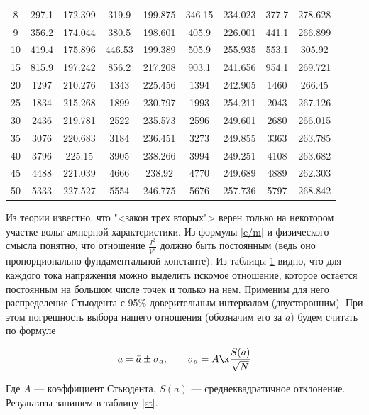 \documentclass[12pt]{kiarticle}
\begin{document}
\begin{table}
\begin{tabular}{|c|c|c|c|c|c|c|c|c|}
 8 & 297.1 & 172.399 & 319.9 & 199.875 & 346.15 & 234.023 & 377.7 & 278.628 \\
 9 & 356.2 & 174.044 & 380.5 & 198.601 & 405.9 & 226.001 & 441.1 & 266.899 \\
 10 & 419.4 & 175.896 & 446.53 & 199.389 & 505.9 & 255.935 & 553.1 & 305.92 \\
 15 & 815.9 & 197.242 & 856.2 & 217.208 & 903.1 & 241.656 & 954.1 & 269.721 \\
 20 & 1297 & 210.276 & 1343 & 225.456 & 1394 & 242.905 & 1460 & 266.45 \\
 25 & 1834 & 215.268 & 1899 & 230.797 & 1993 & 254.211 & 2043 & 267.126 \\
 30 & 2436 & 219.781 & 2522 & 235.573 & 2596 & 249.601 & 2680 & 266.015 \\
 35 & 3076 & 220.683 & 3184 & 236.451 & 3273 & 249.855 & 3363 & 263.785 \\
 40 & 3796 & 225.15 & 3905 & 238.266 & 3994 & 249.251 & 4108 & 263.682 \\
 45 & 4488 & 221.039 & 4666 & 238.92 & 4770 & 249.689 & 4889 & 262.303 \\
 50 & 5333 & 227.527 & 5554 & 246.775 & 5676 & 257.736 & 5797 & 268.842 \\
	\hline

\end{tabular}%
\label{res}%
\end{table}%

Из теории известно, что "<закон трех вторых"> верен только на некотором участке вольт-амперной характеристики. Из формулы \eqref{e/m} и физического смысла понятно, что отношение $ \frac{I^2}{V^3} $ должно быть постоянным (ведь оно пропорционально фундаментальной константе). Из таблицы \ref{res} видно, что для каждого тока напряжения можно выделить искомое отношение, которое остается постоянным на большом числе точек и только на нем. Применим для него распределение Стьюдента с 95\% доверительным интервалом (двусторонним). При этом погрешность выбора нашего отношения (обозначим его за $ a $) будем считать по формуле

\begin{equation}\label{sigma}
a = \bar{a} \pm \sigma_a, \qquad \sigma_a = A \x \dfrac{S(a)}{\sqrt{N}}
\end{equation} 

Где $ A $ --- коэффициент Стьюдента, $ S(a) $ --- среднеквадратичное отклонение. Результаты запишем в таблицу \ref{st}.
\end{document}
